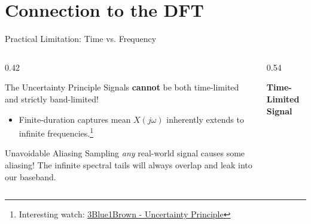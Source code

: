 \section{Connection to the DFT}

\begin{frame}{Practical Limitation: Time vs. Frequency}
  \begin{columns}
    \begin{column}{0.42\textwidth}
      \begin{insightbox}{The Uncertainty Principle}
        Signals \textbf{cannot} be both time-limited and strictly band-limited!
        \begin{itemize}
          \item Finite-duration captures mean $X(j\omega)$ inherently extends to infinite frequencies.\footnote{Interesting watch: \href{https://youtu.be/MBnnXbOM5S4}{3Blue1Brown - Uncertainty Principle}}
        \end{itemize}
      \end{insightbox}
      \begin{conceptbox}{Unavoidable Aliasing}
        Sampling \textit{any} real-world signal causes some aliasing! The infinite spectral tails will always overlap and leak into our baseband.
      \end{conceptbox}
    \end{column}

    \begin{column}{0.54\textwidth}
      \vspace*{0.3cm}

      \centering
      \textbf{Time-Limited Signal} \\


\end{column}
\end{columns}
\end{frame}
